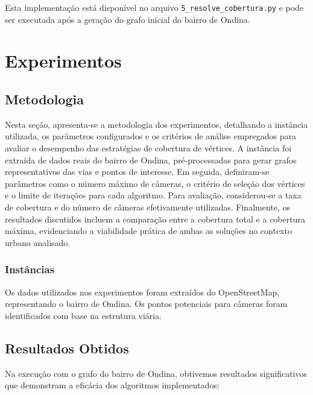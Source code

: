 \documentclass[12pt, a4paper]{report}
\begin{document}
Esta implementação está disponível no arquivo \texttt{5\_resolve\_cobertura.py} e pode ser executada após a geração do grafo inicial do bairro de Ondina.

\chapter{Experimentos}

\section{Metodologia}
\noindent
Nesta seção, apresenta-se a metodologia dos experimentos, detalhando a instância utilizada, os parâmetros configurados e os critérios de análise empregados para avaliar o desempenho das estratégias de cobertura de vértices. A instância foi extraída de dados reais do bairro de Ondina, pré-processadas para gerar grafos representativos das vias e pontos de interesse. Em seguida, definiram-se parâmetros como o número máximo de câmeras, o critério de seleção dos vértices e o limite de iterações para cada algoritmo. Para avaliação, considerou-se a taxa de cobertura e do número de câmeras efetivamente utilizadas. Finalmente, os resultados discutidos incluem a comparação entre a cobertura total e a cobertura máxima, evidenciando a viabilidade prática de ambas as soluções no contexto urbano analisado.

\subsection{Instâncias}
Os dados utilizados nos experimentos foram extraídos do OpenStreetMap, representando o bairro de Ondina. Os pontos potenciais para câmeras foram identificados com base na estrutura viária.

\section{Resultados Obtidos}
Na execução com o grafo do bairro de Ondina, obtivemos resultados significativos que demonstram a eficácia dos algoritmos implementados:
\end{document}
